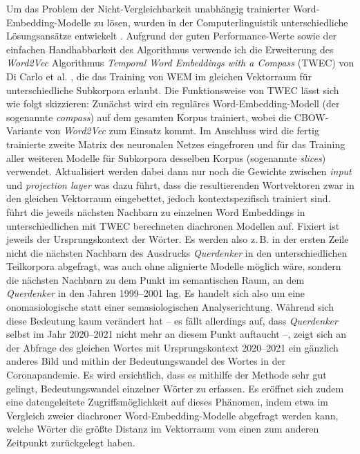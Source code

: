 Um das Problem der Nicht-Vergleichbarkeit unabhängig trainierter Word-Embedding-Modelle zu lösen, wurden in der Computerlinguistik unterschiedliche Lösungsansätze entwickelt \autocites[siehe etwa][]{dubossarskyBottomApproachCategory2015, fankhauserAnalyzingDomainSpecific2019, yaoDynamicWordEmbeddings2018, dicarloTrainingTemporalWord2019}. Aufgrund der guten Performance-Werte sowie der einfachen Handhabbarkeit des Algorithmus verwende ich die Erweiterung des \emph{Word2Vec} Algorithmus \emph{Temporal Word Embeddings with a Compass} (TWEC) von Di Carlo et al. \autocite*{dicarloTrainingTemporalWord2019}, die das Training von WEM im gleichen Vektorraum für unterschiedliche Subkorpora erlaubt. Die Funktionsweise von TWEC lässt sich wie folgt skizzieren: Zunächst wird ein reguläres Word-Embedding-Modell (der sogenannte \emph{compass}) auf dem gesamten Korpus trainiert, wobei die CBOW-Variante von \emph{Word2Vec} zum Einsatz kommt. Im Anschluss wird die fertig trainierte zweite Matrix des neuronalen Netzes eingefroren und für das Training aller weiteren Modelle für Subkorpora desselben Korpus (sogenannte \emph{slices}) verwendet. Aktualisiert werden dabei dann nur noch die Gewichte zwischen \emph{input} und \emph{projection layer} was dazu führt, dass die resultierenden Wortvektoren zwar in den gleichen Vektorraum eingebettet, jedoch kontextspezifisch trainiert sind.  führt die jeweils nächsten Nachbarn zu einzelnen Word Embeddings in unterschiedlichen mit TWEC berechneten diachronen Modellen auf. Fixiert ist jeweils der Ursprungskontext der Wörter. Es werden also z.\,B. in der ersten Zeile nicht die nächsten Nachbarn des Ausdrucks \emph{Querdenker} in den unterschiedlichen Teilkorpora abgefragt, was auch ohne alignierte Modelle möglich wäre, sondern die nächsten Nachbarn zu dem Punkt im semantischen Raum, an dem \emph{Querdenker} in den Jahren 1999--2001 lag. Es handelt sich also um eine onomasiologische statt einer semasiologischen Analyserichtung. Während sich diese Bedeutung kaum verändert hat -- es fällt allerdings auf, dass \emph{Querdenker} selbst im Jahr 2020--2021 nicht mehr an diesem Punkt auftaucht --, zeigt sich an der Abfrage des gleichen Wortes mit Ursprungskontext 2020--2021 ein gänzlich anderes Bild und mithin der Bedeutungswandel des Wortes in der Coronapandemie. Es wird ersichtlich, dass es mithilfe der Methode sehr gut gelingt, Bedeutungswandel einzelner Wörter zu erfassen. Es eröffnet sich zudem eine datengeleitete Zugriffsmöglichkeit auf dieses Phänomen, indem etwa im Vergleich zweier diachroner Word-Embedding-Modelle abgefragt werden kann, welche Wörter die größte Distanz im Vektorraum vom einen zum anderen Zeitpunkt zurückgelegt haben.

